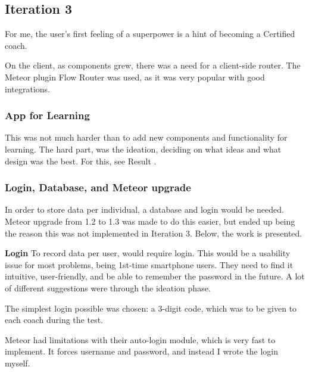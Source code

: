\subsection{Iteration 3}

For me, the user's first feeling of a superpower is a hint of becoming a Certified coach. 

On the client, as components grew, there was a need for a client-side router. The Meteor plugin Flow Router was used, as it was very popular with good integrations.

\subsubsection{App for Learning}
This was not much harder than to add new components and functionality for learning. The hard part, was the ideation, deciding on what ideas and what design was the best. For this, see Result .

\subsubsection{Login, Database, and Meteor upgrade}
In order to store data per individual, a database and login would be needed. Meteor upgrade from 1.2 to 1.3 was made to do this easier, but ended up being the reason this was not implemented in Iteration 3. Below, the work is presented.

\textbf{Login}
To record data per user, would require login. This would be a usability issue for most problems, being 1st-time smartphone users. They need to find it intuitive, user-friendly, and be able to remember the password in the future. A lot of different suggestions were through the ideation phase.

The simplest login possible was chosen: a 3-digit code, which was to be given to each coach during the test.


Meteor had limitations with their auto-login module, which is very fast to implement. It forces username and password, and instead I wrote the login myself.

